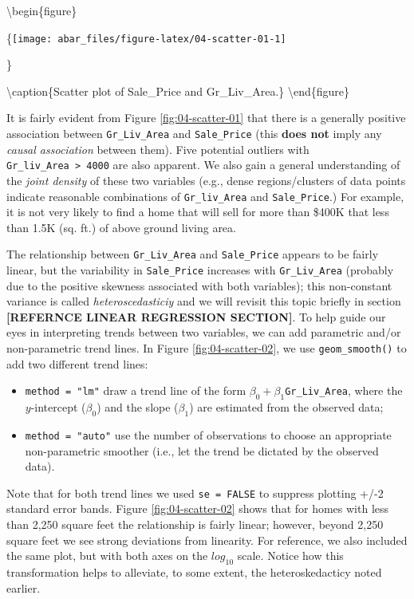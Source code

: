 \documentclass[]{book}
\theoremstyle{definition}
\theoremstyle{definition}
\theoremstyle{definition}
\theoremstyle{remark}
\begin{document}
\textbackslash{}begin\{figure\}

\{\centering \texttt{[image: abar\_files/figure-latex/04-scatter-01-1]}

\}

\textbackslash{}caption\{Scatter plot of Sale\_Price and
Gr\_Liv\_Area.\}\label{fig:04-scatter-01} \textbackslash{}end\{figure\}

It is fairly evident from Figure \ref{fig:04-scatter-01} that there is a
generally positive association between \texttt{Gr\_Liv\_Area} and
\texttt{Sale\_Price} (this \textbf{does not} imply any \emph{causal
association} between them). Five potential outliers with
\texttt{Gr\_liv\_Area\ \textgreater{}\ 4000} are also apparent. We also
gain a general understanding of the \emph{joint density} of these two
variables (e.g., dense regions/clusters of data points indicate
reasonable combinations of \texttt{Gr\_liv\_Area} and
\texttt{Sale\_Price}.) For example, it is not very likely to find a home
that will sell for more than \$400K that less than 1.5K (sq. ft.) of
above ground living area.

The relationship between \texttt{Gr\_Liv\_Area} and \texttt{Sale\_Price}
appears to be fairly linear, but the variability in \texttt{Sale\_Price}
increases with \texttt{Gr\_Liv\_Area} (probably due to the positive
skewness associated with both variables); this non-constant variance is
called \emph{heteroscedasticiy} and we will revisit this topic briefly
in section \textbf{{[}REFERNCE LINEAR REGRESSION SECTION{]}}. To help
guide our eyes in interpreting trends between two variables, we can add
parametric and/or non-parametric trend lines. In Figure
\ref{fig:04-scatter-02}, we use \texttt{geom\_smooth()} to add two
different trend lines:

\begin{itemize}
\item
  \texttt{method\ =\ "lm"} draw a trend line of the form
  \(\beta_0 + \beta_1\)\texttt{Gr\_Liv\_Area}, where the \(y\)-intercept
  (\(\beta_0\)) and the slope (\(\beta_1\)) are estimated from the
  observed data;
\item
  \texttt{method\ =\ "auto"} use the number of observations to choose an
  appropriate non-parametric smoother (i.e., let the trend be dictated
  by the observed data).
\end{itemize}

Note that for both trend lines we used \texttt{se\ =\ FALSE} to suppress
plotting +/-2 standard error bands. Figure \ref{fig:04-scatter-02} shows
that for homes with less than 2,250 square feet the relationship is
fairly linear; however, beyond 2,250 square feet we see strong
deviations from linearity. For reference, we also included the same
plot, but with both axes on the \(log_{10}\) scale. Notice how this
transformation helps to alleviate, to some extent, the heteroskedacticy
noted earlier.
\end{document}

